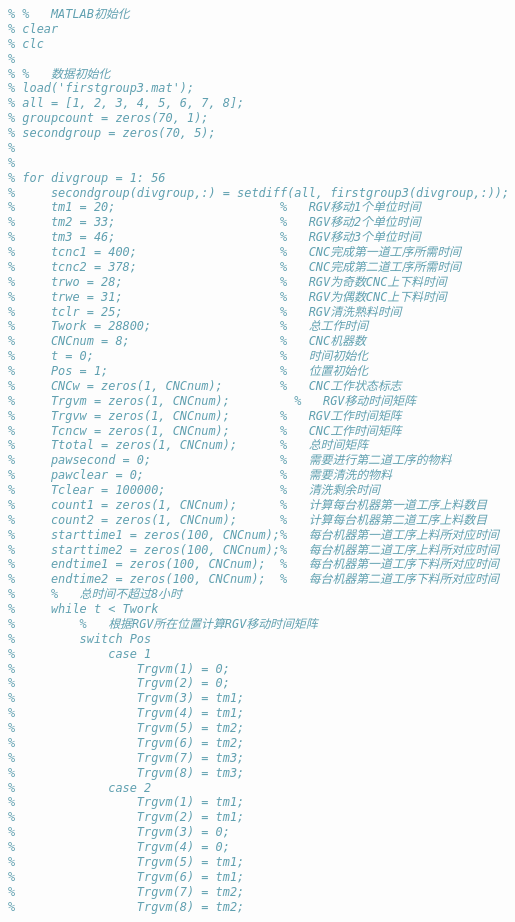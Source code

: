 \documentclass[no-math,withoutpreface,bwprint]{cumcmthesis} %
\numberwithin{equation}{section}
\numberwithin{figure}{section}
\numberwithin{table}{section}
\begin{document}
\begin{lstlisting}[language=matlab]
% %   若为（3,5）分组，遍历代码
% %   MATLAB初始化
% clear
% clc
% 
% %   数据初始化
% load('firstgroup3.mat');
% all = [1, 2, 3, 4, 5, 6, 7, 8];
% groupcount = zeros(70, 1);
% secondgroup = zeros(70, 5);
% 
% 
% for divgroup = 1: 56
%     secondgroup(divgroup,:) = setdiff(all, firstgroup3(divgroup,:));
%     tm1 = 20;                       %   RGV移动1个单位时间
%     tm2 = 33;                       %   RGV移动2个单位时间
%     tm3 = 46;                       %   RGV移动3个单位时间
%     tcnc1 = 400;                    %   CNC完成第一道工序所需时间
%     tcnc2 = 378;                    %   CNC完成第二道工序所需时间
%     trwo = 28;                      %   RGV为奇数CNC上下料时间
%     trwe = 31;                      %   RGV为偶数CNC上下料时间
%     tclr = 25;                      %   RGV清洗熟料时间
%     Twork = 28800;                  %   总工作时间
%     CNCnum = 8;                     %   CNC机器数
%     t = 0;                          %   时间初始化
%     Pos = 1;                        %   位置初始化
%     CNCw = zeros(1, CNCnum);        %   CNC工作状态标志
%     Trgvm = zeros(1, CNCnum);      	%   RGV移动时间矩阵
%     Trgvw = zeros(1, CNCnum);       %   RGV工作时间矩阵
%     Tcncw = zeros(1, CNCnum);       %   CNC工作时间矩阵
%     Ttotal = zeros(1, CNCnum);      %   总时间矩阵
%     pawsecond = 0;                  %   需要进行第二道工序的物料
%     pawclear = 0;                   %   需要清洗的物料
%     Tclear = 100000;                %   清洗剩余时间
%     count1 = zeros(1, CNCnum);      %   计算每台机器第一道工序上料数目
%     count2 = zeros(1, CNCnum);      %   计算每台机器第二道工序上料数目
%     starttime1 = zeros(100, CNCnum);%   每台机器第一道工序上料所对应时间
%     starttime2 = zeros(100, CNCnum);%   每台机器第二道工序上料所对应时间
%     endtime1 = zeros(100, CNCnum);  %   每台机器第一道工序下料所对应时间
%     endtime2 = zeros(100, CNCnum);  %   每台机器第二道工序下料所对应时间
%     %   总时间不超过8小时
%     while t < Twork
%         %   根据RGV所在位置计算RGV移动时间矩阵
%         switch Pos
%             case 1
%                 Trgvm(1) = 0;
%                 Trgvm(2) = 0;
%                 Trgvm(3) = tm1;
%                 Trgvm(4) = tm1;
%                 Trgvm(5) = tm2;
%                 Trgvm(6) = tm2;
%                 Trgvm(7) = tm3;
%                 Trgvm(8) = tm3;
%             case 2
%                 Trgvm(1) = tm1;
%                 Trgvm(2) = tm1;
%                 Trgvm(3) = 0;
%                 Trgvm(4) = 0;
%                 Trgvm(5) = tm1;
%                 Trgvm(6) = tm1;
%                 Trgvm(7) = tm2;
%                 Trgvm(8) = tm2;               

\end{lstlisting}
\end{document}
